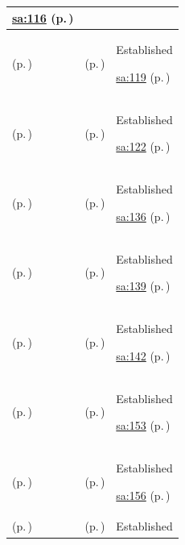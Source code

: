 \begin{longtable}{|>{\raggedright\arraybackslash}p{0.27\TableWidth}|>{\raggedright\arraybackslash}p{0.27\TableWidth}|>{\raggedright\arraybackslash}p{0.46\TableWidth}|}
 \hyperref[rad:sa:110]{sa:116} (p.\,\pageref{rad:sa:110})\\\hline
\nameref{function:bind-diagnostic-report} (p.\,\pageref{function:bind-diagnostic-report}) & \nameref{feature:feat-sa-16} (p.\,\pageref{feature:feat-sa-16}) & Established

 \hyperref[rad:sa:110]{sa:119} (p.\,\pageref{rad:sa:110})\\\hline
\nameref{function:distribute-diagnostic-report} (p.\,\pageref{function:distribute-diagnostic-report}) & \nameref{feature:feat-sa-17} (p.\,\pageref{feature:feat-sa-17}) & Established

 \hyperref[rad:sa:110]{sa:122} (p.\,\pageref{rad:sa:110})\\\hline
\nameref{function:receive-medication-order} (p.\,\pageref{function:receive-medication-order}) & \nameref{feature:feat-sa-18} (p.\,\pageref{feature:feat-sa-18}) & Established

 \hyperref[rad:sa:130]{sa:136} (p.\,\pageref{rad:sa:130})\\\hline
\nameref{function:track-dispense-event} (p.\,\pageref{function:track-dispense-event}) & \nameref{feature:feat-sa-19} (p.\,\pageref{feature:feat-sa-19}) & Established

 \hyperref[rad:sa:130]{sa:139} (p.\,\pageref{rad:sa:130})\\\hline
\nameref{function:receive-medication-administration-event} (p.\,\pageref{function:receive-medication-administration-event}) & \nameref{feature:feat-sa-20} (p.\,\pageref{feature:feat-sa-20}) & Established

 \hyperref[rad:sa:130]{sa:142} (p.\,\pageref{rad:sa:130})\\\hline
\nameref{function:receive-procedure-booking-request} (p.\,\pageref{function:receive-procedure-booking-request}) & \nameref{feature:feat-sa-21} (p.\,\pageref{feature:feat-sa-21}) & Established

 \hyperref[rad:sa:149]{sa:153} (p.\,\pageref{rad:sa:149})\\\hline
\nameref{function:receive-procedural-documentation} (p.\,\pageref{function:receive-procedural-documentation}) & \nameref{feature:feat-sa-22} (p.\,\pageref{feature:feat-sa-22}) & Established

 \hyperref[rad:sa:149]{sa:156} (p.\,\pageref{rad:sa:149})\\\hline
\nameref{function:receive-clinical-document} (p.\,\pageref{function:receive-clinical-document}) & \nameref{feature:feat-sa-23} (p.\,\pageref{feature:feat-sa-23}) & Established


\end{longtable}
